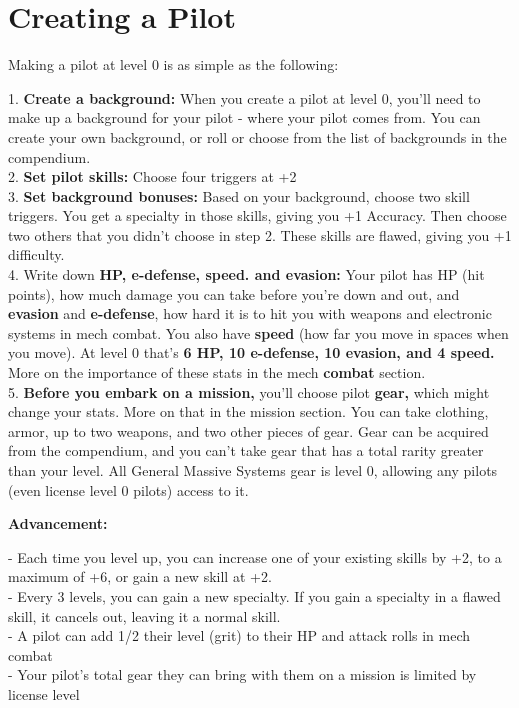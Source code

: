 \section{Creating a Pilot}

Making a pilot at level 0 is as simple as the following:

1.  \textbf{Create a background:} When you create a pilot at level 0, you’ll need to make up a background for your pilot - where your pilot comes from. You can create your own background, or roll or choose from the list of backgrounds in the compendium.\\
2.   \textbf{Set pilot skills:} Choose four triggers at +2\\
3.   \textbf{Set background bonuses:} Based on your background, choose two skill triggers. You get a specialty in those skills, giving you +1 Accuracy. Then choose two others that you didn’t choose in step 2. These skills are flawed, giving you +1 difficulty.\\
4.   Write down \textbf{HP, e-defense, speed. and evasion:} Your pilot has HP (hit points), how much damage you can take before you’re down and out, and \textbf{evasion} and \textbf{e-defense}, how hard it is to hit you with weapons and electronic systems in mech combat. You also have \textbf{speed} (how far you move in spaces when you move). At level 0 that’s \textbf{6 HP, 10 e-defense, 10 evasion, and 4 speed.} More on the importance of these stats in the mech \textbf{combat} section.\\
5.   \textbf{Before you embark on a mission,} you’ll choose pilot \textbf{gear,} which might change your stats. More on that in the mission section. You can take clothing, armor, up to two weapons, and two other pieces of gear. Gear can be acquired from the compendium, and you can’t take gear that has a total rarity greater than your level. All General Massive Systems gear is level 0, allowing any pilots (even license level 0 pilots) access to it.

\textbf{Advancement:}

- Each time you level up, you can increase one of your existing skills by +2, to a maximum of +6, or gain a new skill at +2.\\
- Every 3 levels, you can gain a new specialty. If you gain a specialty in a flawed skill, it cancels out, leaving it a normal skill.\\
- A pilot can add 1/2 their level (grit) to their HP and attack rolls in mech combat\\
- Your pilot’s total gear they can bring with them on a mission is limited by license level

